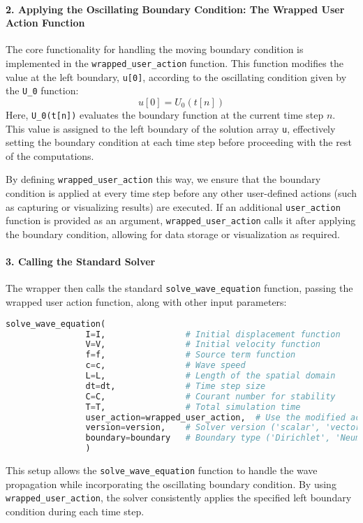 \documentclass{article}
\begin{document}
			\paragraph{2. Applying the Oscillating Boundary Condition: The Wrapped User Action Function}
			
			The core functionality for handling the moving boundary condition is implemented in the \texttt{wrapped\_user\_action} function. This function modifies the value at the left boundary, \texttt{u[0]}, according to the oscillating condition given by the \texttt{U\_0} function:
			\[
			u[0] = U_0(t[n])
			\]
			Here, \texttt{U\_0(t[n])} evaluates the boundary function at the current time step \( n \). This value is assigned to the left boundary of the solution array \texttt{u}, effectively setting the boundary condition at each time step before proceeding with the rest of the computations.
			
			By defining \texttt{wrapped\_user\_action} this way, we ensure that the boundary condition is applied at every time step before any other user-defined actions (such as capturing or visualizing results) are executed. If an additional \texttt{user\_action} function is provided as an argument, \texttt{wrapped\_user\_action} calls it after applying the boundary condition, allowing for data storage or visualization as required.
			
			\paragraph{3. Calling the Standard Solver}
			
			The wrapper then calls the standard \texttt{solve\_wave\_equation} function, passing the wrapped user action function, along with other input parameters:
			\begin{lstlisting}[language=Python]
				solve_wave_equation(
				I=I,                # Initial displacement function
				V=V,                # Initial velocity function
				f=f,                # Source term function
				c=c,                # Wave speed
				L=L,                # Length of the spatial domain
				dt=dt,              # Time step size
				C=C,                # Courant number for stability
				T=T,                # Total simulation time
				user_action=wrapped_user_action,  # Use the modified action to apply boundary condition
				version=version,    # Solver version ('scalar', 'vectorized', etc.)
				boundary=boundary   # Boundary type ('Dirichlet', 'Neumann', etc.)
				)
			\end{lstlisting}
			This setup allows the \texttt{solve\_wave\_equation} function to handle the wave propagation while incorporating the oscillating boundary condition. By using \texttt{wrapped\_user\_action}, the solver consistently applies the specified left boundary condition during each time step.
			
\end{document}
